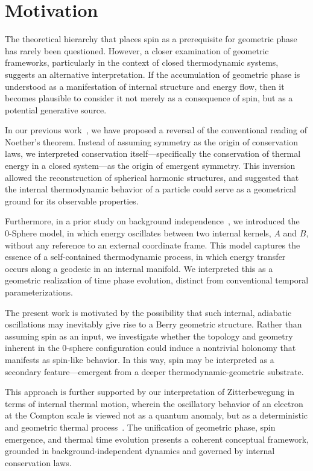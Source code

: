 \documentclass[%
 reprint,
 amsmath,amssymb,
 aps,
]{revtex4-1}
\numberwithin{equation}{section}%
\begin{document}
\section{Motivation} \label{sec:motivation}

The theoretical hierarchy that places spin as a prerequisite for geometric phase has rarely been questioned. However, a closer examination of geometric frameworks, particularly in the context of closed thermodynamic systems, suggests an alternative interpretation. If the accumulation of geometric phase is understood as a manifestation of internal structure and energy flow, then it becomes plausible to consider it not merely as a consequence of spin, but as a potential generative source.

In our previous work~\cite{hanamura2506.0119}, we have proposed a reversal of the conventional reading of Noether's theorem. Instead of assuming symmetry as the origin of conservation laws, we interpreted conservation itself—specifically the conservation of thermal energy in a closed system—as the origin of emergent symmetry. This inversion allowed the reconstruction of spherical harmonic structures, and suggested that the internal thermodynamic behavior of a particle could serve as a geometrical ground for its observable properties.

Furthermore, in a prior study on background independence~\cite{hanamura2501.0130}, we introduced the 0-Sphere model, in which energy oscillates between two internal kernels, $A$ and $B$, without any reference to an external coordinate frame. This model captures the essence of a self-contained thermodynamic process, in which energy transfer occurs along a geodesic in an internal manifold. We interpreted this as a geometric realization of time phase evolution, distinct from conventional temporal parameterizations.

The present work is motivated by the possibility that such internal, adiabatic oscillations may inevitably give rise to a Berry geometric structure. Rather than assuming spin as an input, we investigate whether the topology and geometry inherent in the 0-sphere configuration could induce a nontrivial holonomy that manifests as spin-like behavior. In this way, spin may be interpreted as a secondary feature—emergent from a deeper thermodynamic-geometric substrate.

This approach is further supported by our interpretation of Zitterbewegung in terms of internal thermal motion, wherein the oscillatory behavior of an electron at the Compton scale is viewed not as a quantum anomaly, but as a deterministic and geometric thermal process~\cite{hanamura1811.0312}. The unification of geometric phase, spin emergence, and thermal time evolution presents a coherent conceptual framework, grounded in background-independent dynamics and governed by internal conservation laws.
\end{document}
